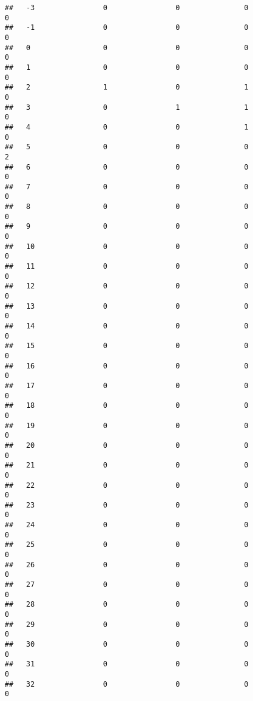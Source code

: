 \documentclass[]{article}
\begin{document}
\begin{verbatim}
##   -3                0                0               0                0
##   -1                0                0               0                0
##   0                 0                0               0                0
##   1                 0                0               0                0
##   2                 1                0               1                0
##   3                 0                1               1                0
##   4                 0                0               1                0
##   5                 0                0               0                2
##   6                 0                0               0                0
##   7                 0                0               0                0
##   8                 0                0               0                0
##   9                 0                0               0                0
##   10                0                0               0                0
##   11                0                0               0                0
##   12                0                0               0                0
##   13                0                0               0                0
##   14                0                0               0                0
##   15                0                0               0                0
##   16                0                0               0                0
##   17                0                0               0                0
##   18                0                0               0                0
##   19                0                0               0                0
##   20                0                0               0                0
##   21                0                0               0                0
##   22                0                0               0                0
##   23                0                0               0                0
##   24                0                0               0                0
##   25                0                0               0                0
##   26                0                0               0                0
##   27                0                0               0                0
##   28                0                0               0                0
##   29                0                0               0                0
##   30                0                0               0                0
##   31                0                0               0                0
##   32                0                0               0                0

\end{verbatim}
\end{document}
